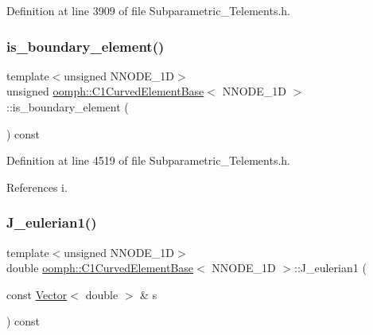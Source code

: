 Definition at line 3909 of file Subparametric\+\_\+\+Telements.\+h.

\mbox{\label{classoomph_1_1C1CurvedElementBase_a819873b0790335875e6c009d63615464}} 
\subsubsection{\texorpdfstring{is\+\_\+boundary\+\_\+element()}{is\_boundary\_element()}}
{\footnotesize\ttfamily template$<$unsigned N\+N\+O\+D\+E\+\_\+1D$>$ \\
unsigned \hyperlink{classoomph_1_1C1CurvedElementBase}{oomph\+::\+C1\+Curved\+Element\+Base}$<$ N\+N\+O\+D\+E\+\_\+1D $>$\+::is\+\_\+boundary\+\_\+element (\begin{DoxyParamCaption}{ }\end{DoxyParamCaption}) const\hspace{0.3cm}{\ttfamily [inline]}}



Definition at line 4519 of file Subparametric\+\_\+\+Telements.\+h.



References i.

\mbox{\label{classoomph_1_1C1CurvedElementBase_af8d7bb2e120f655629419f7627d95602}} 
\subsubsection{\texorpdfstring{J\+\_\+eulerian1()}{J\_eulerian1()}}
{\footnotesize\ttfamily template$<$unsigned N\+N\+O\+D\+E\+\_\+1D$>$ \\
double \hyperlink{classoomph_1_1C1CurvedElementBase}{oomph\+::\+C1\+Curved\+Element\+Base}$<$ N\+N\+O\+D\+E\+\_\+1D $>$\+::J\+\_\+eulerian1 (\begin{DoxyParamCaption}\item[{const \hyperlink{classoomph_1_1Vector}{Vector}$<$ double $>$ \&}]{s }\end{DoxyParamCaption}) const\hspace{0.3cm}{\ttfamily [inline]}}



